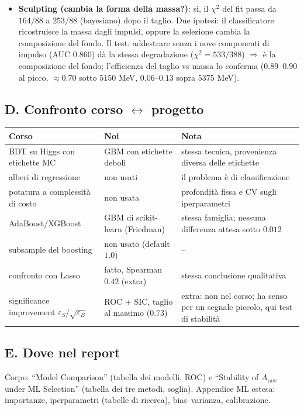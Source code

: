 \documentclass[11pt,a4paper]{article}
\newcommand{\Araw}{A_{\mathrm{raw}}}
\begin{document}
\begin{itemize}
\item \textbf{Sculpting (cambia la forma della massa?)}: s\`i, il $\chi^2$ del fit passa da $164/88$ a $253/88$ (bayesiano) dopo il taglio. Due ipotesi: il classificatore ricostruisce la massa dagli impulsi, oppure la selezione cambia la composizione del fondo. Il test: addestrare senza i nove componenti di impulso (AUC $0.860$) d\`a la stessa degradazione ($\chi^2=533/388$) $\Rightarrow$ \`e la composizione del fondo; l'efficienza del taglio vs massa lo conferma ($0.89$--$0.90$ al picco, $\approx0.70$ sotto $5150$ MeV, $0.06$--$0.13$ sopra $5375$ MeV).
\end{itemize}

\subsection*{D. Confronto corso $\leftrightarrow$ progetto}
\begin{center}
\begin{tabular}{p{4.2cm}p{4.4cm}p{6.0cm}}
\toprule
Corso & Noi & Nota \\
\midrule
BDT su Higgs con etichette MC & GBM con etichette deboli & stessa tecnica, provenienza diversa delle etichette \\
alberi di regressione & non usati & il problema \`e di classificazione \\
potatura a complessit\`a di costo & non usata & profondit\`a fissa e CV sugli iperparametri \\
AdaBoost/XGBoost & GBM di scikit-learn (Friedman) & stessa famiglia; nessuna differenza attesa sotto $0.012$ \\
subsample del boosting & non usato (default $1.0$) & -- \\
confronto con Lasso & fatto, Spearman $0.42$ (extra) & stessa conclusione qualitativa \\
significance improvement $\varepsilon_S/\sqrt{\varepsilon_B}$ & ROC + SIC, taglio al massimo ($0.73$) & extra: non nel corso; ha senso per un segnale piccolo, qui test di stabilit\`a \\
\bottomrule
\end{tabular}
\end{center}

\subsection*{E. Dove nel report}
Corpo: ``Model Comparison'' (tabella dei modelli, ROC) e ``Stability of $\Araw$ under ML Selection'' (tabella dei tre metodi, soglia). Appendice ML estesa: importanze, iperparametri (tabelle di ricerca), bias--varianza, calibrazione.
\end{document}
